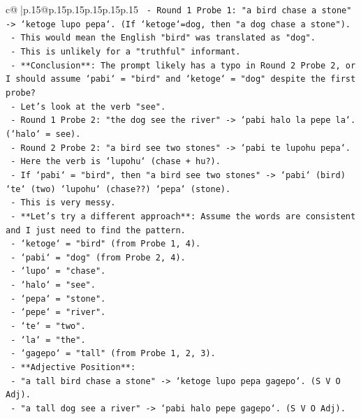 \documentclass{article}
\begin{document}
{\begin{supertabular}{c@{$\;$}|p{.15\linewidth}@{}p{.15\linewidth}p{.15\linewidth}p{.15\linewidth}p{.15\linewidth}p{.15\linewidth}}
{{{\texttt{      {-} Round 1 Probe 1: "a bird chase a stone" {-}> `ketoge lupo pepa`. (If `ketoge`=dog, then "a dog chase a stone").} \\
\texttt{      {-} This would mean the English "bird" was translated as "dog".} \\
\texttt{      {-} This is unlikely for a "truthful" informant.} \\
\texttt{      {-} **Conclusion**: The prompt likely has a typo in Round 2 Probe 2, or I should assume `pabi` = "bird" and `ketoge` = "dog" despite the first probe?} \\
\texttt{      {-} Let's look at the verb "see".} \\
\texttt{      {-} Round 1 Probe 2: "the dog see the river" {-}> `pabi halo la pepe la`. (`halo` = see).} \\
\texttt{      {-} Round 2 Probe 2: "a bird see two stones" {-}> `pabi te lupohu pepa`.} \\
\texttt{      {-} Here the verb is `lupohu` (chase + hu?).} \\
\texttt{      {-} If `pabi` = "bird", then "a bird see two stones" {-}> `pabi` (bird) `te` (two) `lupohu` (chase??) `pepa` (stone).} \\
\texttt{      {-} This is very messy.} \\
\texttt{      {-} **Let's try a different approach**: Assume the words are consistent and I just need to find the pattern.} \\
\texttt{      {-} `ketoge` = "bird" (from Probe 1, 4).} \\
\texttt{      {-} `pabi` = "dog" (from Probe 2, 4).} \\
\texttt{      {-} `lupo` = "chase".} \\
\texttt{      {-} `halo` = "see".} \\
\texttt{      {-} `pepa` = "stone".} \\
\texttt{      {-} `pepe` = "river".} \\
\texttt{      {-} `te` = "two".} \\
\texttt{      {-} `la` = "the".} \\
\texttt{      {-} `gagepo` = "tall" (from Probe 1, 2, 3).} \\
\texttt{      {-} **Adjective Position**:} \\
\texttt{        {-} "a tall bird chase a stone" {-}> `ketoge lupo pepa gagepo`. (S V O Adj).} \\
\texttt{        {-} "a tall dog see a river" {-}> `pabi halo pepe gagepo`. (S V O Adj).} \\
}}}
\end{supertabular}}
\end{document}
